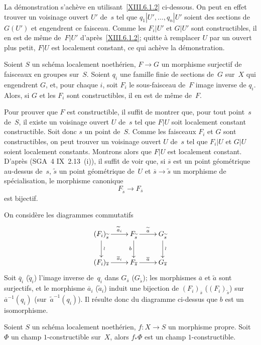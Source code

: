 La d\'emonstration s'ach\`eve en utilisant~\ref{XIII.6.1.2}
ci-dessous. On peut en effet trouver un voisinage ouvert $U'$ de~$s$
tel que $q_1|U',\dots,q_n|U'$ soient des sections de~$G(U')$ et
engendrent ce faisceau. Comme les $F_i|U'$ et $G|U'$ sont
constructibles, il en est de m\^eme de~$F|U'$
d'apr\`es~\ref{XIII.6.1.2}; quitte \`a remplacer $U$ par un ouvert
plus petit, $F|U$ est localement constant, ce qui ach\`eve la
d\'emonstration.

\begin{sublemme}
\label{XIII.6.1.2}
Soient
$S$ un sch\'ema localement noeth\'erien, $F\to G$ un
morphisme surjectif de faisceaux en groupes sur~$S$. Soient $q_i$ une
famille finie de sections de~$G$ sur~$X$ qui engendrent $G$, et, pour
chaque $i$, soit $F_i$ le sous-faisceau de~$F$ image inverse de
$q_i$. Alors, si $G$ et les $F_i$ sont constructibles, il en est de
m\^eme de~$F$.
\end{sublemme}

Pour prouver que $F$ est constructible, il suffit de montrer que, pour
tout point~$s$ de~$S$, il existe un voisinage ouvert $U$ de~$s$ tel
que $F|U$ soit localement constant constructible. Soit donc $s$ un
point de~$S$. Comme les faisceaux $F_i$ et $G$ sont constructibles, on
peut trouver un voisinage ouvert $U$ de~$s$ tel que $F_i|U$ et $G|U$
soient localement constants. Montrons alors que $F|U$ est localement
constant. D'apr\`es (SGA~4 IX~2.13~(i)), il suffit de voir que, si
$\overline{s}$ est un point g\'eom\'etrique au-dessus de~$s$,
$\tilde{s}$ un point g\'eom\'etrique de~$U$ et
$\overline{s}\to\tilde{s}$ un morphisme de sp\'ecialisation, le
morphisme canonique
$$
F_{\tilde{s}}\to F_{\overline{s}}
$$
est bijectif.

On consid\`ere les diagrammes commutatifs
$$
\xymatrix{{(F_i)_{\tilde{s}}}\ar[r]^-{\tilde{a}_i}\ar[d]^{\wr}&{F_{\tilde{s}}}\ar[r]^-{\tilde{a}}\ar[d]_b&{G_{\tilde{s}}}\ar[d]^{\wr}\\{(F_i)_{\overline{s}}}\ar[r]^-{\overline{a}_i}&{F_{\overline{s}}}\ar[r]^-{\overline{a}}&{G_{\overline{s}}}}
$$
Soit $\overline{q}_i$ (\resp $\tilde{q}_i$) l'image inverse de~$q_i$
dans $G_{\overline{s}}$ (\resp $G_{\tilde{s}}$); les morphismes
$\overline{a}$ et $\tilde{a}$ sont surjectifs, et le morphisme
$\overline{a}_i$ (\resp $\tilde{a}_i$) induit une bijection de
$(F_i)_{\overline{s}}$ (\resp $(F_i)_{\tilde{s}}$) sur~$\overline{a}^{-1}(q_i)$ (\resp sur~$\tilde{a}^{-1}(q_i)$). Il r\'esulte
donc du diagramme ci-dessus que $b$ est un isomorphisme.

\begin{corollaire}
\label{XIII.6.2}
Soient
$S$ un sch\'ema localement noeth\'erien, $f\colon X\to S$
un morphisme propre. Soit $\Phi$ un champ $1$-constructible sur~$X$,
alors $f_*\Phi$ est un champ \hbox{$1$-constructible}.
\end{corollaire}

